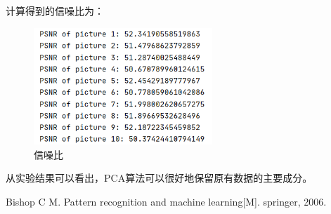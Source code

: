 \documentclass[a4paper,11pt,UTF8]{ctexart}
\newcommand{\bottomcaption}{%
\setlength{\abovecaptionskip}{6pt}%
\setlength{\belowcaptionskip}{6pt}%
\caption}
\begin{document}
计算得到的信噪比为：
\begin{figure}[H]
  \centering
  \includegraphics[width=0.6\textwidth]{PSNR.png}
  \bottomcaption{信噪比}
\end{figure}
从实验结果可以看出，PCA算法可以很好地保留原有数据的主要成分。
\begin{thebibliography}{99} 
Bishop C M. Pattern recognition and machine learning[M]. springer, 2006.
\end{thebibliography}
\end{document}
